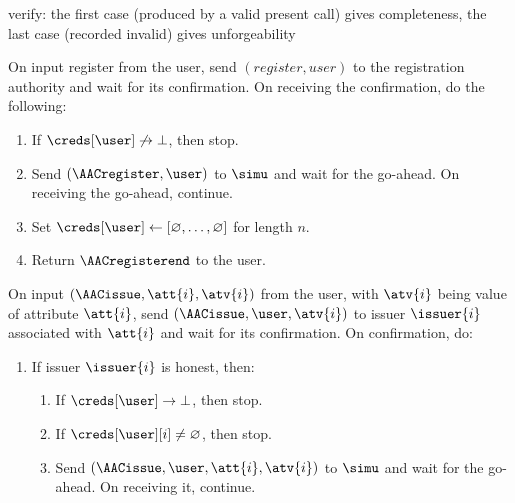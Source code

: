\begin{outline}
  \item verify: the first case (produced by a valid present call) gives completeness, the last case (recorded invalid) gives unforgeability
\end{outline}

    \begin{framed}


	\fuinterface{\AACregister} On input register from the user, send $(register,
user)$ to the registration authority and wait for its confirmation.  On
receiving the confirmation, do the following:

	\begin{enumerate}

	  \item If $\creds[\user] \not\rightarrow \bot$, then stop.

	  \item Send $(\AACregister, \user)$ to $\simu$ and wait for the
go-ahead. On receiving the go-ahead, continue.

	  \item Set $\creds[\user] \leftarrow [\varnothing, \ldots,
\varnothing]$ for length $n$.

	  \item Return $\AACregisterend$ to the user.

	\end{enumerate}

	\fuinterface{\AACissue} On input $(\AACissue, \att{i},\atv{i})$ from the user,
with $\atv{i}$ being value of attribute $\att{i}$, send $(\AACissue, \user,
\atv{i})$ to issuer $\issuer{i}$ associated with $\att{i}$ and wait for its
confirmation.  On confirmation, do:

	\begin{enumerate}

	  \item If issuer $\issuer{i}$ is honest, then:

	    \begin{enumerate}

	      \item If $\creds[\user] \rightarrow \bot$, then stop.

	      \item If $\creds[\user][i] \neq \varnothing$, then stop.

	      \item Send $(\AACissue, \user, \att{i}, \atv{i})$ to $\simu$ and
wait for the go-ahead. On receiving it, continue.


\end{enumerate}
\end{enumerate}
\end{framed}
